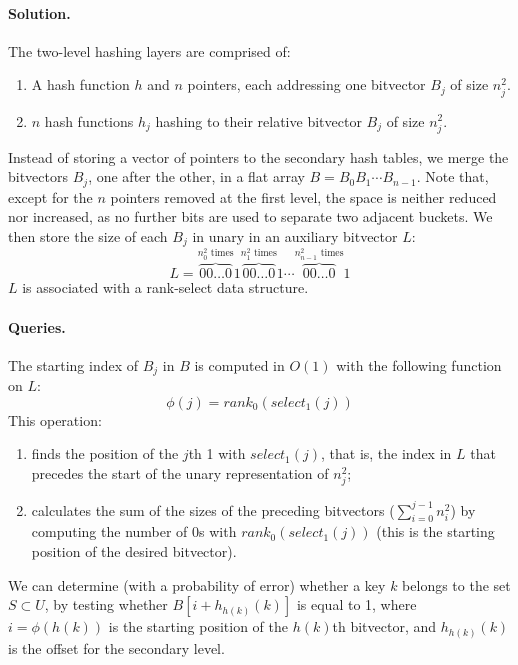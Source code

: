\paragraph{Solution.} The two-level hashing layers are comprised of:
\begin{enumerate}
  \item A hash function $h$ and $n$ pointers, each addressing one bitvector $B_j$ of size $n_j^2$.
  \item $n$ hash functions $h_j$ hashing to their relative bitvector $B_j$ of size $n_j^2$.
\end{enumerate}
Instead of storing a vector of pointers to the secondary hash tables, we merge the bitvectors $B_j$, one after the other, in a flat array $B=B_0B_1 \cdots B_{n-1}$. Note that, except for the $n$ pointers removed at the first level, the space is neither reduced nor increased, as no further bits are used to separate two adjacent buckets. We then store the size of each $B_j$ in unary in an auxiliary bitvector $L$:
$$L = \overbrace{00 \dots 0}^{n_0^2 \text{ times}} 1 
      \overbrace{00 \dots 0}^{n_1^2 \text{ times}} 1 \cdots
      \overbrace{00 \dots 0}^{n_{n-1}^2 \text{ times}} 1$$
$L$ is associated with a rank-select data structure.

\paragraph{Queries.} The starting index of $B_j$ in $B$ is computed in $O(1)$ with the following function on $L$: $$\phi(j)=rank_0(select_1(j))$$ This operation:
\begin{enumerate}
  \item finds the position of the $j$th 1 with $select_1(j)$, that is, the index in $L$ that precedes the start of the unary representation of $n_j^2$;
  \item calculates the sum of the sizes of the preceding bitvectors ($\sum_{i=0}^{j-1} n_i^2$) by computing the number of $0$s with $rank_0(select_1(j))$ (this is the starting position of the desired bitvector).
\end{enumerate}
We can determine (with a probability of error) whether a key $k$ belongs to the set $S \subset U$, by testing whether $B[i+h_{h(k)}(k)]$ is equal to 1, where $i=\phi(h(k))$ is the starting position of the $h(k)$th bitvector, and $h_{h(k)}(k)$ is the offset for the secondary level.

